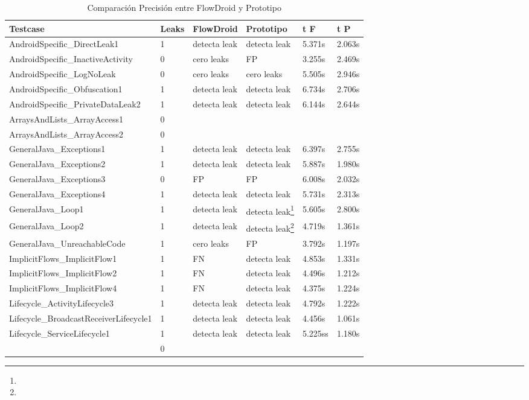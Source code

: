 \begin{table}[H]
\small\addtolength{\tabcolsep}{-3pt}
\caption{Comparación Precisión entre FlowDroid y Prototipo}
\label{tb:comparacion}
\begin{tabular}{|p{5.8cm}|p{1cm}|p{2.1cm}|p{2.1cm}|p{1cm}|p{1cm}|}
	\hline
	\textbf{Testcase} & \textbf{Leaks} & \textbf{FlowDroid} &
	\textbf{Prototipo} & \textbf{ t F} & 
	\textbf{t P}\\
	\hline
	AndroidSpecific\_DirectLeak1 & 1 & detecta leak & detecta leak &5.371s &2.063s\\
	\hline
	AndroidSpecific\_InactiveActivity & 0 & cero leaks & FP  &3.255s &2.469s\\
	\hline
	AndroidSpecific\_LogNoLeak & 0 & cero leaks & cero leaks &5.505s &2.946s\\
	\hline
	 AndroidSpecific\_Obfuscation1 & 1 & detecta leak & detecta leak &6.734s
	 &2.706s\\
	\hline
	 AndroidSpecific\_PrivateDataLeak2 & 1 & detecta leak & detecta leak &
	 6.144s &2.644s\\
	\hline
	 ArraysAndLists\_ArrayAccess1 & 0 & & & &\\
	\hline
	 ArraysAndLists\_ArrayAccess2 & 0 & & & &\\
	 \hline
	 GeneralJava\_Exceptions1 & 1 & detecta leak & detecta leak &6.397s &2.755s\\
	\hline
	 GeneralJava\_Exceptions2 & 1 & detecta leak & detecta leak &5.887s &1.980s\\
	\hline
	GeneralJava\_Exceptions3 & 0 & FP & FP &6.008s &2.032s\\
	\hline
	GeneralJava\_Exceptions4 & 1 & detecta leak & detecta leak &5.731s &2.313s\\
	\hline
	GeneralJava\_Loop1 & 1 & detecta leak & detecta leak\footnote{} &5.605s
	&2.800s\\
	\hline
	GeneralJava\_Loop2 & 1 & detecta leak & detecta leak\footnote{} &4.719s
	&1.361s\\
	\hline
	GeneralJava\_UnreachableCode & 1 & cero leaks & FP &3.792s &1.197s\\
	\hline
	ImplicitFlows\_ImplicitFlow1 & 1 & FN & detecta leak &4.853s &1.331s\\
	\hline
	ImplicitFlows\_ImplicitFlow2 & 1 & FN & detecta leak &4.496s &1.212s\\
	\hline
	ImplicitFlows\_ImplicitFlow4 & 1 & FN & detecta leak &4.375s &1.224s\\
	\hline
	Lifecycle\_ActivityLifecycle3 & 1 & detecta leak & detecta leak &4.792s
	&1.222s\\
	\hline
	Lifecycle\_BroadcastReceiverLifecycle1 & 1 & detecta leak & detecta leak
	&4.456s &1.061s\\
	\hline
	Lifecycle\_ServiceLifecycle1 & 1 & detecta leak &detecta leak &5.225ss
	&1.180s\\
	\hline
	& 0 & & & &\\
	\hline
\end{tabular}
\end{table}

